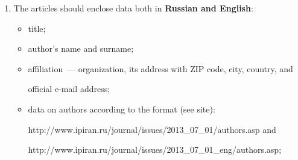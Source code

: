 {\begin{enumerate}[1.]
\noindent


{\sf


http://www.ipiran.ru/journal/template\_iiep\_ssi\_2024.zip}.\\[-13.5pt]















\item The articles should enclose data both in \textbf{Russian and English}:


\begin{itemize}


\item title;\\[-13.5pt]


\item author's name and surname;\\[-13.5pt]


\item affiliation~--- organization, its address with ZIP code, city, country, and


official e-mail address;\\[-13.5pt]


\item data on authors according to the format (see site):





{\sf http://www.ipiran.ru/journal/issues/2013\_07\_01/authors.asp}  and





{\sf  http://www.ipiran.ru/journal/issues/2013\_07\_01\_eng/authors.asp};\\[-13.5pt]





\pagebreak





\def\leftfootline{\small{\textbf{\thepage}


\hfill INFORMATIKA I EE PRIMENENIYA~--- INFORMATICS AND APPLICATIONS\ \ \ 2024\


\ \ volume~18\ \ \ issue\ 3}


}%



\end{itemize}
\end{enumerate}}
